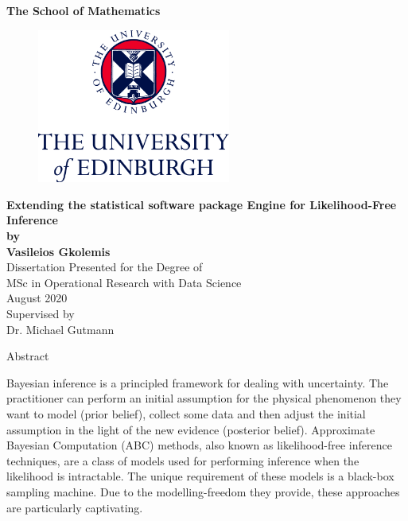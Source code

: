 \documentclass[11pt,twoside]{article}
\numberwithin{Theorem}{section}
\numberwithin{Definition}{section}
\numberwithin{Lemma}{section}
\numberwithin{Algorithm}{section}
\numberwithin{equation}{section}
\begin{document}
\pagestyle{empty}

\begin{titlepage}
\vspace*{.5em}
\center
\textbf{\large{The School of Mathematics}} \\
\vspace*{1em}
\begin{figure}[!h]
\centering
\includegraphics[width=180pt]{Thesis/images/CentredLogoCMYK.jpg}
\end{figure}
\vspace{2em}
\textbf{\Huge{Extending the statistical software package Engine for Likelihood-Free Inference}}\\[2em]
\textbf{\LARGE{by}}\\
\vspace{2em}
\textbf{\LARGE{Vasileios Gkolemis}}\\
\vspace{6.5em}
\Large{Dissertation Presented for the Degree of\\
MSc in Operational Research with Data Science}\\
\vspace{6.5em}
\Large{August 2020}\\
\vspace{3em}
\Large{Supervised by\\Dr. Michael Gutmann}
\vfill
\end{titlepage}

\cleardoublepage
\begin{center}
\Large{Abstract}
\end{center}

Bayesian inference is a principled framework for dealing with
uncertainty. The practitioner can
perform an initial assumption for the physical phenomenon they want to
model (prior belief), collect some data and then adjust the
initial assumption in the light of the new evidence (posterior
belief).  Approximate Bayesian Computation (ABC) methods, also known
as likelihood-free inference techniques, are a class of models used for
performing inference when the likelihood is intractable. The unique
requirement of these models is a black-box sampling machine. Due to
the modelling-freedom they provide, these approaches are particularly
captivating.
\end{document}
